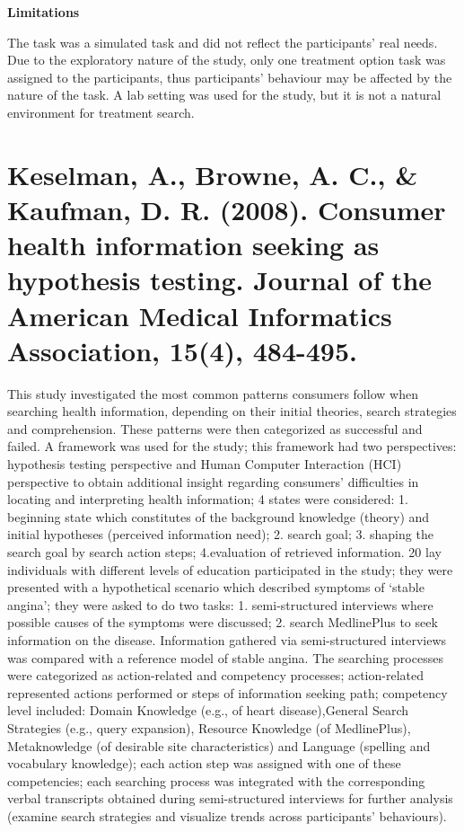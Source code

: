 \documentclass[]{article}
\begin{document}
\textbf{Limitations}

The task was a simulated task and did not reflect the participants’ real needs. Due to the exploratory nature of the study, only one treatment option task was assigned to the participants, thus participants’ behaviour may be affected by the nature of the task. A lab setting was used for the study, but it is not a natural environment for treatment search.  

\section{Keselman, A., Browne, A. C., \& Kaufman, D. R. (2008). Consumer health information seeking as hypothesis testing. Journal of the American Medical Informatics Association, 15(4), 484-495.} 

This study investigated the most common patterns consumers follow when searching health information, depending on their initial theories, search strategies and comprehension. These patterns were then categorized as successful and failed. A framework was used for the study; this framework had two perspectives: hypothesis testing perspective and Human Computer Interaction (HCI) perspective to obtain additional insight regarding consumers’ difficulties in locating and interpreting health information; 4 states were considered: 1. beginning state which constitutes of the background knowledge (theory) and initial hypotheses (perceived information need); 2. search goal; 3. shaping the search goal by search action steps; 4.evaluation of retrieved information. 20 lay individuals with different levels of education participated in the study; they were presented with a hypothetical scenario which described symptoms of ‘stable angina’; they were asked to do two tasks: 1. semi-structured interviews where possible causes of the symptoms were discussed; 2. search MedlinePlus to seek information on the disease. Information gathered via semi-structured interviews was compared with a reference model of stable angina. The searching processes were categorized as action-related and competency processes; action-related represented actions performed or steps of information seeking path; competency level included: Domain Knowledge (e.g., of heart disease),General Search Strategies (e.g., query expansion), Resource Knowledge (of MedlinePlus), Metaknowledge (of desirable site characteristics) and Language (spelling and vocabulary knowledge); each action step was assigned with one of these competencies; each searching process was integrated with the corresponding verbal transcripts obtained during semi-structured interviews for further analysis (examine search strategies and visualize trends across participants’ behaviours). 
\end{document}
